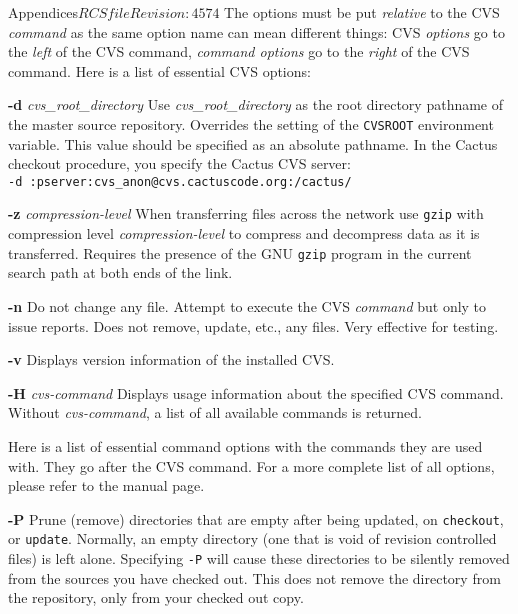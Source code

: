 \begin{cactuspart}{Appendices}{$RCSfile$}{$Revision: 4574 $}
The options must be put \emph{relative} to the CVS \emph{command} as the
same option name can mean different things: CVS \emph{options} go to the
\emph{left} of the CVS command, \emph{command options} go to the \emph{right}
of the CVS command. Here is a list of essential CVS options:

\begin{Lentry}

\item[{\bf -d} \textit{cvs\_root\_directory}]
Use \textit{cvs\_root\_directory} as the root directory  pathname  of
the  master source repository.  Overrides
the setting of the  {\tt CVSROOT}  environment  variable.
This value should be specified as an absolute pathname.
In the Cactus checkout procedure, you specify the Cactus CVS server:\\
{\tt -d :pserver:cvs\_anon@cvs.cactuscode.org:/cactus/}

\item[{\bf -z} \textit{compression-level}]
When transferring files across the network use {\tt gzip}
with compression level  \textit{compression-level}  to  compress  and
decompress  data as it is transferred.
Requires the presence of the GNU {\tt gzip} program  in
the current search path at both ends of the link.

\item[{\bf -n}]
Do not change any file. Attempt to execute the CVS \textit{command} but
only to issue reports. Does not remove, update, etc., any files. Very
effective for testing.

\item[{\bf -v}]
Displays version information of the installed CVS.

\item[{\bf -H} \textit{cvs-command}]
Displays usage information about the specified CVS command. Without
\textit{cvs-command}, a list of all available commands is returned.
\end{Lentry}

Here is a list of essential command options with the
commands they are used with. They go after the CVS command. For a more
complete list of all options, please refer to the manual page.

\begin{Lentry}

\item[{\bf -P}]
Prune  (remove)  directories  that  are empty after being updated, on
{\tt checkout}, or  {\tt update}.   Normally, an  empty  directory
(one that is void of revision controlled files) is  left  alone.
Specifying  {\tt -P} will cause these directories to be silently
removed from the sources you have checked out.  This does not remove
the directory from the repository, only from your checked out copy.


\end{Lentry}
\end{cactuspart}
